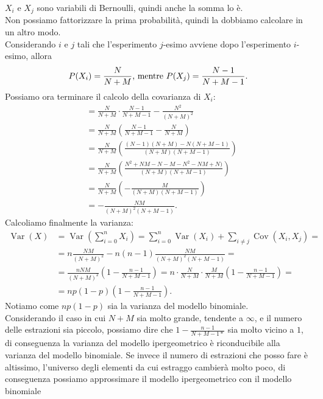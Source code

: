 \noindent $X_i \text{ e } X_j$ sono variabili di Bernoulli, quindi anche la somma lo è. \\ Non possiamo fattorizzare la prima probabilità, quindi la dobbiamo calcolare in un altro modo. \\
Considerando $i$ e $j$ tali che l'esperimento $j$-esimo avviene dopo l'esperimento $i$-esimo, allora
$$
P(X_i) = \frac{N}{N+M} \textnormal{, mentre } P(X_j) = \frac{N - 1}{N + M - 1}.
$$
Possiamo ora terminare il calcolo della covarianza di $X_i$:
\begin{align*}
    &= \frac{N}{N + M} \cdot \frac{N - 1}{N + M - 1} - \frac{N^2}{(N + M)^2} \\ 
    &= \frac{N}{N + M} \left( \frac{N-1}{N + M - 1} - \frac{N}{N + M} \right) \\
    &= \frac{N}{N + M} \left( \frac{(N-1)(N+M) - N(N+M-1)}{(N+M)(N+M-1)} \right) \\
    &= \frac{N}{N + M} \left( \frac{N^2 + NM - N - M - N^2 -NM + N)}{(N+M)(N+M-1)} \right) \\
    &= \frac{N}{N + M} \left( - \frac{M}{(N+M)(N+M-1)} \right) \\ 
    &= - \frac{NM}{(N+M)^2 (N + M - 1)}.
\end{align*}
Calcoliamo finalmente la varianza:
\begin{align*}
    \operatorname{Var}(X) &= \operatorname{Var}\left(\sum_{i=0}^{n} X_i\right) = \sum_{i=0}^n \operatorname{Var}(X_i) + \sum_{i \neq j} \operatorname{Cov}(X_i, X_j) = \\ 
    &= n \frac{NM}{(N + M)^2} - n(n-1) \frac{NM}{(N + M)^2 (N + M - 1)} = \\
    &= \frac{nNM}{(N + M)^2} \left( 1 - \frac{n-1}{N + M - 1} \right ) = n \cdot \frac{N}{N + M} \cdot \frac{M}{N + M} \left( 1 - \frac{n-1}{N + M - 1} \right ) = \\
    &= n p (1-p) \left( 1 - \frac{n-1}{N + M - 1} \right ).
\end{align*}
Notiamo come $np(1-p)$ sia la varianza del modello binomiale. \\
Considerando il caso in cui $N + M$ sia molto grande, tendente a $\infty$, e il numero delle estrazioni sia piccolo, possiamo dire che $1 - \frac{n-1}{N + M - 1*}$ sia molto vicino a $1$, di conseguenza la varianza del modello ipergeometrico è riconducibile alla varianza del modello binomiale.
Se invece il numero di estrazioni che posso fare è altissimo, l'universo degli elementi da cui estraggo cambierà molto poco, di conseguenza possiamo approssimare il modello ipergeometrico con il modello binomiale

